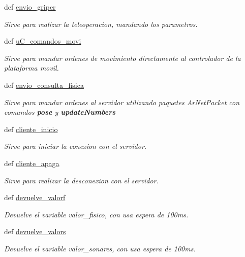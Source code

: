 \begin{DoxyCompactItemize}
def \hyperlink{classcliente__lib_1_1cliente__lib_a3c43af1448ad0fa10cfa6f398b7029db}{envio\_\-griper}
\begin{DoxyCompactList}\small\item\em Sirve para realizar la teleoperacion, mandando los parametros. \end{DoxyCompactList}\item 
def \hyperlink{classcliente__lib_1_1cliente__lib_ade1f44e9270c8835c284832a72b96b6c}{uC\_\-comandos\_\-movi}
\begin{DoxyCompactList}\small\item\em Sirve para mandar ordenes de movimiento directamente al controlador de la plataforma movil. \end{DoxyCompactList}\item 
def \hyperlink{classcliente__lib_1_1cliente__lib_ac3e89d3066207b05b217a50f549c239a}{envio\_\-consulta\_\-fisica}
\begin{DoxyCompactList}\small\item\em Sirve para mandar ordenes al servidor utilizando paquetes ArNetPacket con comandos {\bfseries pose} y {\bfseries updateNumbers} \end{DoxyCompactList}\item 
def \hyperlink{classcliente__lib_1_1cliente__lib_a1a7b5475a98772f0e48a4e1fd76e8d47}{cliente\_\-inicio}
\begin{DoxyCompactList}\small\item\em Sirve para iniciar la conexion con el servidor. \end{DoxyCompactList}\item 
def \hyperlink{classcliente__lib_1_1cliente__lib_a14a49495fd71fab84d36060e604415a5}{cliente\_\-apaga}
\begin{DoxyCompactList}\small\item\em Sirve para realizar la desconexion con el servidor. \end{DoxyCompactList}\item 
def \hyperlink{classcliente__lib_1_1cliente__lib_a3ca67c0c9d7f0a622abd740c780f64d1}{devuelve\_\-valorf}
\begin{DoxyCompactList}\small\item\em Devuelve el variable valor\_\-fisico, con usa espera de 100ms. \end{DoxyCompactList}\item 
def \hyperlink{classcliente__lib_1_1cliente__lib_a127d026872fbd11f4f5bbe4a73424b77}{devuelve\_\-valors}
\begin{DoxyCompactList}\small\item\em Devuelve el variable valor\_\-sonares, con usa espera de 100ms. \end{DoxyCompactList}\end{DoxyCompactItemize}
